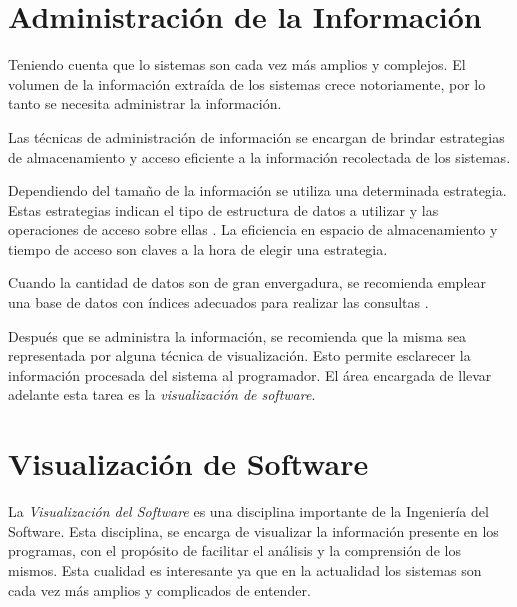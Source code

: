 \documentclass[a4paper,12pt]{report}
\begin{document}


\section{Administración de la Información}

Teniendo cuenta que lo sistemas son cada vez más amplios y complejos. El volumen de la información extraída de los sistemas crece notoriamente, por lo tanto se necesita administrar la información.

Las técnicas de administración de información se encargan de brindar estrategias de almacenamiento y acceso eficiente a la información recolectada de los sistemas. 

Dependiendo del tamaño de la información se utiliza una determinada estrategia. Estas estrategias indican el tipo de estructura de datos a utilizar y las operaciones de acceso sobre ellas \cite{AAJU88,TSTA80}. La eficiencia en espacio de almacenamiento y tiempo de acceso son claves a la hora de elegir una estrategia.

Cuando la cantidad de datos son de gran envergadura, se recomienda emplear una base de datos con índices adecuados para realizar las consultas \cite{ERNS99}.

Después que se administra la información, se recomienda  que la misma sea representada por alguna técnica de visualización. Esto permite esclarecer la información procesada del sistema al programador. El área encargada de llevar adelante esta tarea es la \textit{visualización de software}.


\section{Visualización de Software}

La \textit{Visualización del Software} es una disciplina importante de la Ingeniería del Software. Esta disciplina, se encarga de visualizar la información presente en los programas, con el propósito de facilitar el análisis y la comprensión de los mismos. Esta cualidad es interesante ya que en la actualidad los sistemas son cada vez más amplios y complicados de entender.
\end{document}
